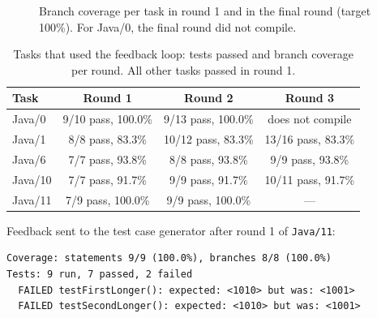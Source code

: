 \documentclass[11pt,a4paper]{article}
\begin{document}
\begin{figure}[H]
\centering
{}
\caption{Branch coverage per task in round 1 and in the final round (target 100\%). For Java/0, the final round did not compile.}
\label{fig:coverage}
\end{figure}

\begin{table}[H]
\centering
\small
\begin{tabular}{@{}lccc@{}}
\toprule
Task & Round 1 & Round 2 & Round 3 \\
\midrule
Java/0  & 9/10 pass, 100.0\% & 9/13 pass, 100.0\% & does not compile \\
Java/1  & 8/8 pass, 83.3\%   & 10/12 pass, 83.3\% & 13/16 pass, 83.3\% \\
Java/6  & 7/7 pass, 93.8\%   & 8/8 pass, 93.8\%   & 9/9 pass, 93.8\% \\
Java/10 & 7/7 pass, 91.7\%   & 9/9 pass, 91.7\%   & 10/11 pass, 91.7\% \\
Java/11 & 7/9 pass, 100.0\%  & 9/9 pass, 100.0\%  & --- \\
\bottomrule
\end{tabular}
\caption{Tasks that used the feedback loop: tests passed and branch coverage per round. All other tasks passed in round 1.}
\label{tab:rounds}
\end{table}

\noindent Feedback sent to the test case generator after round 1 of \texttt{Java/11}:
\begin{lstlisting}[style=prompt]
Coverage: statements 9/9 (100.0%), branches 8/8 (100.0%)
Tests: 9 run, 7 passed, 2 failed
  FAILED testFirstLonger(): expected: <1010> but was: <1001>
  FAILED testSecondLonger(): expected: <1010> but was: <1001>
\end{lstlisting}
\end{document}
